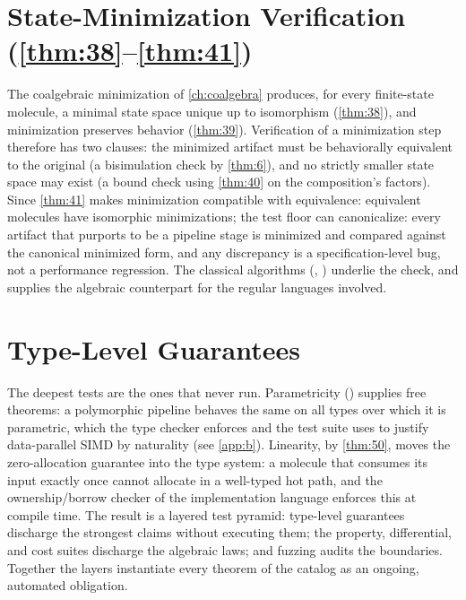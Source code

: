 \section{State-Minimization Verification (\autoref{thm:38}--\autoref{thm:41})}
The coalgebraic minimization of \autoref{ch:coalgebra} produces, for every finite-state molecule, a minimal state space unique up to isomorphism (\ref{thm:38}), and minimization preserves behavior (\ref{thm:39}). Verification of a minimization step therefore has two clauses: the minimized artifact must be behaviorally equivalent to the original (a bisimulation check by \ref{thm:6}), and no strictly smaller state space may exist (a bound check using \ref{thm:40} on the composition's factors). Since \ref{thm:41} makes minimization compatible with equivalence: equivalent molecules have isomorphic minimizations; the test floor can canonicalize: every artifact that purports to be a pipeline stage is minimized and compared against the canonical minimized form, and any discrepancy is a specification-level bug, not a performance regression. The classical algorithms (\cite{nerode}, \cite{hopcroft}) underlie the check, and \cite{brzozowski} supplies the algebraic counterpart for the regular languages involved.

\section{Type-Level Guarantees}
The deepest tests are the ones that never run. Parametricity (\cite{wadler}) supplies free theorems: a polymorphic pipeline behaves the same on all types over which it is parametric, which the type checker enforces and the test suite uses to justify data-parallel SIMD by naturality (see \autoref{app:b}). Linearity, by \ref{thm:50}, moves the zero-allocation guarantee into the type system: a molecule that consumes its input exactly once cannot allocate in a well-typed hot path, and the ownership/borrow checker of the implementation language enforces this at compile time. The result is a layered test pyramid: type-level guarantees discharge the strongest claims without executing them; the property, differential, and cost suites discharge the algebraic laws; and fuzzing audits the boundaries. Together the layers instantiate every theorem of the catalog as an ongoing, automated obligation.
